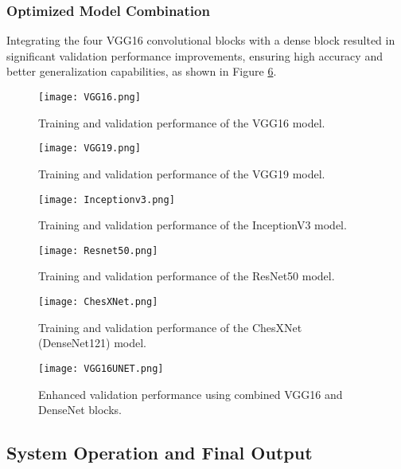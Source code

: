 \documentclass[10pt]{article}
\begin{document}
\subsubsection{Optimized Model Combination}
Integrating the four VGG16 convolutional blocks with a dense block resulted in significant validation performance improvements, ensuring high accuracy and better generalization capabilities, as shown in Figure \ref{fig:VGG16UNETFullVal}.



\begin{figure}[!htbp]
    \centering
    \texttt{[image: VGG16.png]}
    \caption{Training and validation performance of the VGG16 model.}
    \label{fig:VGG16}
\end{figure}

\begin{figure}[!htbp]
    \centering
    \texttt{[image: VGG19.png]}
    \caption{Training and validation performance of the VGG19 model.}
    \label{fig:VGG19}
\end{figure}

\begin{figure}[!htbp]
    \centering
    \texttt{[image: Inceptionv3.png]}
    \caption{Training and validation performance of the InceptionV3 model.}
    \label{fig:Inceptionv3}
\end{figure}

\begin{figure}[!htbp]
    \centering
    \texttt{[image: Resnet50.png]}
    \caption{Training and validation performance of the ResNet50 model.}
    \label{fig:Resnet50}
\end{figure}

\begin{figure}[!htbp]
    \centering
    \texttt{[image: ChesXNet.png]}
    \caption{Training and validation performance of the ChesXNet (DenseNet121) model.}
    \label{fig:ChesXNetDenseNet121}
\end{figure}

\begin{figure}[!htbp]
    \centering
    \texttt{[image: VGG16UNET.png]}
    \caption{Enhanced validation performance using combined VGG16 and DenseNet blocks.}
    \label{fig:VGG16UNETFullVal}
\end{figure}


\subsection{System Operation and Final Output}
\end{document}
